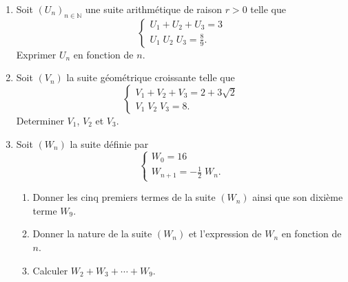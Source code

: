 \begin{exo}\label{exo:suite-2}
      \begin{enumerate}
            \item Soit $(U_n)_{n\in\mathbb{N}}$ une suite arithm\'etique de raison $r > 0$ telle que 
                  \[
                        \left\lbrace
                              \begin{array}{l}
                                    U_1 + U_2 + U_3 = 3 \\
                                    U_1 \; U_2 \; U_3 = \frac{8}{9} .
                              \end{array}
                        \right.
                  \]
                  Exprimer $U_n$ en fonction de $n$.
            \item Soit $(V_n)$ la suite g\'eom\'etrique croissante telle que 
                  \[
                        \left\lbrace
                              \begin{array}{l}
                                    V_1 + V_2 + V_3 = 2 + 3 \sqrt{2} \\
                                    V_1 \; V_2 \; V_3 = 8 .
                              \end{array}
                        \right.
                  \]
                  Determiner $V_1$, $V_2$ et $V_3$.
            \item Soit $(W_n)$ la suite d\'efinie par 
                  \[
                        \left\lbrace
                              \begin{array}{l}
                                    W_0 = 16  \\
                                    W_{n+1} = -\frac{1}{2} \; W_n .
                              \end{array}
                        \right.
                  \]      
                  \begin{enumerate}
                        \item Donner les cinq premiers termes de la suite $(W_n)$ ainsi que son dixi\`eme terme $W_9$.
                        \item Donner la nature de la suite $(W_n)$ et l'expression de $W_n$ en fonction de $n$.
                        \item Calculer $W_2 + W_3 + \cdots + W_9$.
                  \end{enumerate}
      \end{enumerate}
\end{exo}

